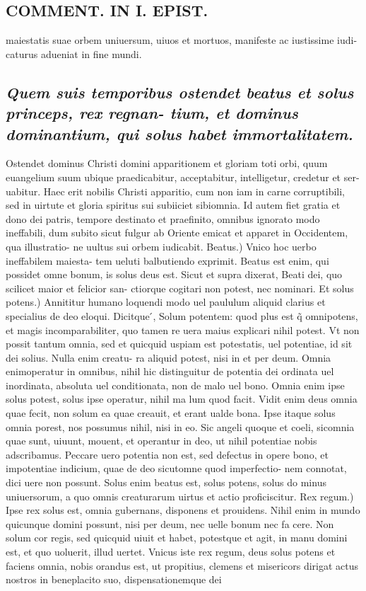 \documentclass{article}
\begin{document}
\begin{pages}
\section*{COMMENT. IN I. EPIST. }
\marginpar{[ p.538 ]}\pstart maiestatis suae orbem uniuersum, uiuos et mortuos, manifeste ac iustissime iudi- caturus adueniat in fine mundi.  \pend
{}
{}
\subsection*{\textit{Quem suis temporibus ostendet beatus et solus princeps, rex regnan- tium, et dominus dominantium, qui solus habet immortalitatem. }}\pstart Ostendet dominus Christi domini apparitionem et gloriam toti orbi, quum euangelium suum ubique praedicabitur, acceptabitur, intelligetur, credetur et ser- uabitur. Haec erit nobilis Christi apparitio, cum non iam in carne corruptibili, sed in uirtute et gloria spiritus sui subiiciet sibiomnia. Id autem fiet gratia et dono dei patris, tempore destinato et praefinito, omnibus ignorato modo ineffabili, dum subito sicut fulgur ab Oriente emicat et apparet in Occidentem, qua illustratio- ne uultus sui orbem iudicabit. Beatus.) Vnico hoc uerbo ineffabilem maiesta- tem ueluti balbutiendo exprimit. Beatus est enim, qui possidet omne bonum, is solus deus est. Sicut et supra dixerat, Beati dei, quo scilicet maior et felicior san- ctiorque cogitari non potest, nec nominari. Et solus potens.) Annititur humano loquendi modo uel paululum aliquid clarius et specialius de deo eloqui. Dicitque ́, Solum potentem: quod plus est q̃ omnipotens, et magis incomparabiliter, quo tamen re uera maius explicari nihil potest. Vt non possit tantum omnia, sed et quicquid uspiam est potestatis, uel potentiae, id sit dei solius. Nulla enim creatu- ra aliquid potest, nisi in et per deum. Omnia enimoperatur in omnibus, nihil hic distinguitur de potentia dei ordinata uel inordinata, absoluta uel conditionata, non de malo uel bono. Omnia enim ipse solus potest, solus ipse operatur, nihil ma lum quod facit. Vidit enim deus omnia quae fecit, non solum ea quae creauit, et erant ualde bona. Ipse itaque solus omnia porest, nos possumus nihil, nisi in eo. Sic angeli quoque et coeli, sicomnia quae sunt, uiuunt, mouent, et operantur in deo, ut nihil potentiae nobis adscribamus. Peccare uero potentia non est, sed defectus in opere bono, et impotentiae indicium, quae de deo sicutomne quod imperfectio- nem connotat, dici uere non possunt. Solus enim beatus est, solus potens, solus do minus uniuersorum, a quo omnis creaturarum uirtus et actio proficiscitur.  \pend\pstart Rex regum.) Ipse rex solus est, omnia gubernans, disponens et prouidens. Nihil enim in mundo quicunque domini possunt, nisi per deum, nec uelle bonum nec fa cere. Non solum cor regis, sed quicquid uiuit et habet, potestque et agit, in manu domini est, et quo uoluerit, illud uertet. Vnicus iste rex regum, deus solus potens et faciens omnia, nobis orandus est, ut propitius, clemens et misericors dirigat actus nostros in beneplacito suo, dispensationemque dei 
\end{pages}
\end{document}
